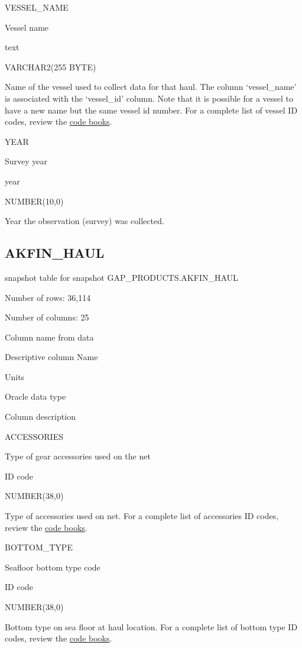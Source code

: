 \documentclass[
  letterpaper,
  oneside,
  open=any]{scrbook}
\begin{document}
VESSEL\_NAME

Vessel name

text

VARCHAR2(255 BYTE)

Name of the vessel used to collect data for that haul. The column
`vessel\_name' is associated with the `vessel\_id' column. Note that it
is possible for a vessel to have a new name but the same vessel id
number. For a complete list of vessel ID codes, review the
\href{https://www.fisheries.noaa.gov/resource/document/groundfish-survey-species-code-manual-and-data-codes-manual}{code
books}.

YEAR

Survey year

year

NUMBER(10,0)

Year the observation (survey) was collected.

\hypertarget{akfin_haul}{%
\subsection{AKFIN\_HAUL}\label{akfin_haul}}

snapshot table for snapshot GAP\_PRODUCTS.AKFIN\_HAUL

Number of rows: 36,114

Number of columns: 25

Column name from data

Descriptive column Name

Units

Oracle data type

Column description

ACCESSORIES

Type of gear accessories used on the net

ID code

NUMBER(38,0)

Type of accessories used on net. For a complete list of accessories ID
codes, review the
\href{https://www.fisheries.noaa.gov/resource/document/groundfish-survey-species-code-manual-and-data-codes-manual}{code
books}.

BOTTOM\_TYPE

Seafloor bottom type code

ID code

NUMBER(38,0)

Bottom type on sea floor at haul location. For a complete list of bottom
type ID codes, review the
\href{https://www.fisheries.noaa.gov/resource/document/groundfish-survey-species-code-manual-and-data-codes-manual}{code
books}.
\end{document}
